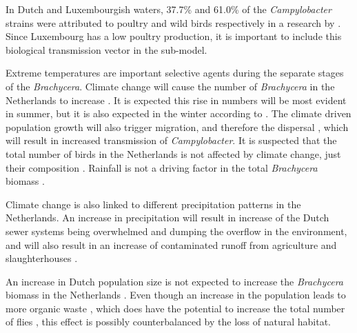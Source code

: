 In Dutch and Luxembourgish waters, 37.7\% and 61.0\% of the \textit{Campylobacter} strains were attributed to poultry and wild birds respectively in a research by \cite{mughini-gras_quantifying_2016}. Since Luxembourg has a low poultry production, it is important to include this biological transmission vector in the sub-model.

Extreme temperatures are important selective agents during the separate stages of the \textit{Brachycera}. Climate change will cause the number of \textit{Brachycera} in the Netherlands to increase \parencite{goulson_predicting_2005}. It is expected this rise in numbers will be most evident in summer, but it is also expected in the winter according to \citeauthor{goulson_predicting_2005}. The climate driven population growth will also trigger migration, and therefore the dispersal \parencite{feder_locomotion_2010}, which will result in increased transmission of \textit{Campylobacter}. It is suspected that the total number of birds in the Netherlands is not affected by climate change, just their composition \parencite{mclean_reduced_2020, knudsen_challenging_2011}. Rainfall is not a driving factor in the total \textit{Brachycera} biomass \parencite{goulson_predicting_2005}.

Climate change is also linked to different precipitation patterns in the Netherlands. An increase in precipitation will result in increase of the Dutch sewer systems being overwhelmed and dumping the overflow in the environment, and will also result in an increase of contaminated runoff from agriculture and slaughterhouses \parencite{kwaad_summer_1991}.

An increase in Dutch population size is not expected to increase the \textit{Brachycera} biomass in the Netherlands \parencite{guenat_effects_2019}. Even though an increase in the population leads to more organic waste \parencite{garcia-garcia_framework_2015}, which does have the potential to increase the total number of flies \parencite{imai_population_1984, rozendaal_houseflies_1997}, this effect is possibly counterbalanced by the loss of natural habitat.




